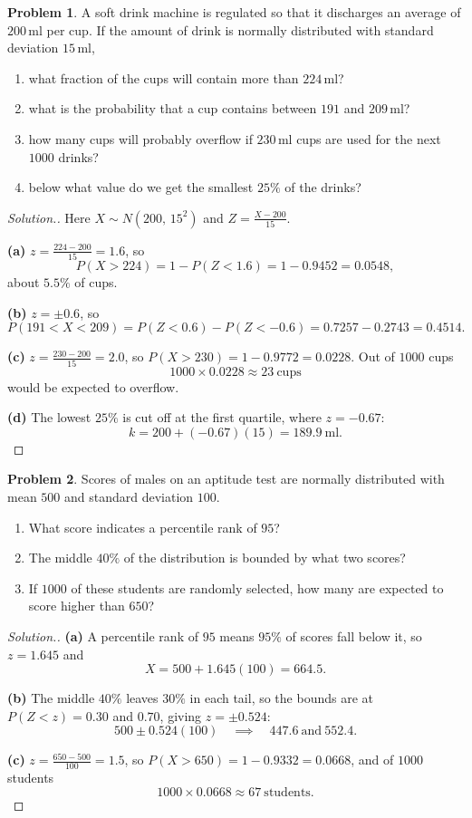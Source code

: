 \documentclass[11pt,a4paper]{article}
\theoremstyle{definition}
\newtheorem{problemx}{Problem}[section]
\newenvironment{problem}{\begin{problemx}}{\end{problemx}}
\newenvironment{solution}
  {\renewcommand{\qedsymbol}{}\begin{proof}[\textit{Solution}.]}
  {\end{proof}}
\begin{document}
\begin{problem}
A soft drink machine is regulated so that it discharges an average of $200$\,ml per cup. If
the amount of drink is normally distributed with standard deviation $15$\,ml,
\begin{enumerate}
\item[(a).] what fraction of the cups will contain more than $224$\,ml?
\item[(b).] what is the probability that a cup contains between $191$ and $209$\,ml?
\item[(c).] how many cups will probably overflow if $230$\,ml cups are used for the next
$1000$ drinks?
\item[(d).] below what value do we get the smallest $25\%$ of the drinks?
\end{enumerate}
\end{problem}

\begin{solution}
Here $X\sim N(200,\,15^2)$ and $Z=\frac{X-200}{15}$.

\textbf{(a)} $z=\frac{224-200}{15}=1.6$, so
\[P(X>224)=1-P(Z<1.6)=1-0.9452=0.0548,\]
about $5.5\%$ of cups.

\textbf{(b)} $z=\pm 0.6$, so
\[P(191<X<209)=P(Z<0.6)-P(Z<-0.6)=0.7257-0.2743=0.4514.\]

\textbf{(c)} $z=\frac{230-200}{15}=2.0$, so $P(X>230)=1-0.9772=0.0228$. Out of $1000$ cups
\[1000\times 0.0228\approx 23\ \text{cups}\]
would be expected to overflow.

\textbf{(d)} The lowest $25\%$ is cut off at the first quartile, where $z=-0.67$:
\[k=200+(-0.67)(15)=189.9\ \text{ml}.\]
\end{solution}

\begin{problem}
Scores of males on an aptitude test are normally distributed with mean $500$ and standard
deviation $100$.
\begin{enumerate}
\item[(a).] What score indicates a percentile rank of $95$?
\item[(b).] The middle $40\%$ of the distribution is bounded by what two scores?
\item[(c).] If $1000$ of these students are randomly selected, how many are expected to
score higher than $650$?
\end{enumerate}
\end{problem}

\begin{solution}
\textbf{(a)} A percentile rank of $95$ means $95\%$ of scores fall below it, so $z=1.645$
and
\[X=500+1.645(100)=664.5.\]

\textbf{(b)} The middle $40\%$ leaves $30\%$ in each tail, so the bounds are at
$P(Z<z)=0.30$ and $0.70$, giving $z=\pm 0.524$:
\[500\pm 0.524(100)\quad\implies\quad 447.6\ \text{and}\ 552.4.\]

\textbf{(c)} $z=\frac{650-500}{100}=1.5$, so $P(X>650)=1-0.9332=0.0668$, and of $1000$
students
\[1000\times 0.0668\approx 67\ \text{students}.\]
\end{solution}
\end{document}
